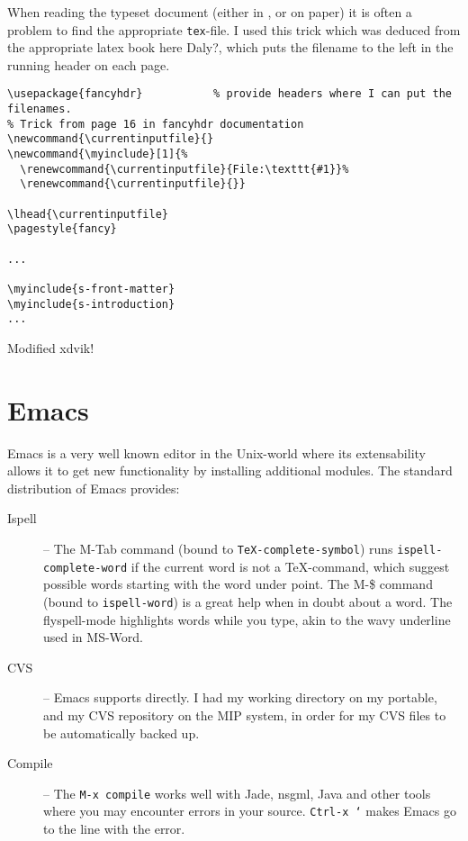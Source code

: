 When reading the typeset document (either in ,
 or on paper) it is often a problem to find the
appropriate \texttt{tex}-file.  I used this trick which was deduced
from the \textsf{appropriate latex book here Daly?}, which puts the
filename to the left in the running header on each page.

\begin{verbatim}
\usepackage{fancyhdr}           % provide headers where I can put the filenames.
% Trick from page 16 in fancyhdr documentation
\newcommand{\currentinputfile}{}
\newcommand{\myinclude}[1]{%
  \renewcommand{\currentinputfile}{File:\texttt{#1}}%
  \renewcommand{\currentinputfile}{}}

\lhead{\currentinputfile}
\pagestyle{fancy}

...

\myinclude{s-front-matter}
\myinclude{s-introduction}
...
\end{verbatim}

\textsf{Modified xdvik}!

\section{Emacs} 
\label{sec:report-writing-tools-emacs} 


Emacs is a very well known editor in the Unix-world where its
extensability allows it to get new functionality by installing
additional modules.  The standard distribution of Emacs provides:

\begin{description}
\item[Ispell] -- The M-Tab command (bound to
  \texttt{TeX-complete-symbol}) runs \texttt{ispell-complete-word} if
  the current word is not a {\TeX}-command, which suggest possible
  words starting with the word under point.  The M-\$ command (bound
  to \texttt{ispell-word}) is a great help when in doubt about a
  word.  The \textsf{flyspell-mode} highlights words while you type,
  akin to the wavy underline used in MS-Word. 

\item[CVS] -- Emacs supports  directly.  I
  had my working directory on my portable, and my CVS repository on
  the MIP system, in order for my CVS files to be automatically backed
  up. 
\item[Compile] -- The \texttt{M-x compile} works well with Jade,
  nsgml, Java and other tools where you may encounter errors in your
  source.  \texttt{Ctrl-x `} makes Emacs go to the line with the
  error.
  
\end{description}

